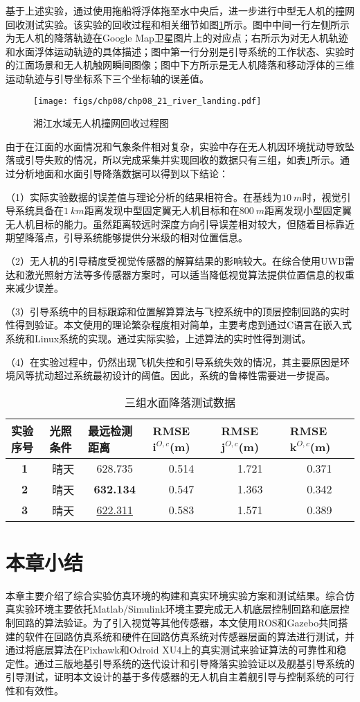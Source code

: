 基于上述实验，通过使用拖船将浮体拖至水中央后，进一步进行中型无人机的撞网回收测试实验。该实验的回收过程和相关细节如图\ref{fig:chp08_21_river_landing}所示。图中中间一行左侧所示为无人机的降落轨迹在Google Map卫星图片上的对应点；右所示为对无人机轨迹和水面浮体运动轨迹的具体描述；图中第一行分别是引导系统的工作状态、实验时的江面场景和无人机触网瞬间图像；图中下方所示是无人机降落和移动浮体的三维运动轨迹与引导坐标系下三个坐标轴的误差值。

\begin{figure}[!t]
	\centering
	\texttt{[image: figs/chp08/chp08\_21\_river\_landing.pdf]}	
	\caption{湘江水域无人机撞网回收过程图}
	\label{fig:chp08_21_river_landing}
\end{figure}

由于在江面的水面情况和气象条件相对复杂，实验中存在无人机因环境扰动导致坠落或引导失败的情况，所以完成采集并实现回收的数据只有三组，如表\ref{lab:three_ship_landing}所示。通过分析地面和水面引导降落数据可以得到以下结论：

（1）实际实验数据的误差值与理论分析的结果相符合。在基线为$10\ m$时，视觉引导系统具备在$1\ km$距离发现中型固定翼无人机目标和在$800\ m$距离发现小型固定翼无人机目标的能力。虽然距离较远时深度方向引导误差相对较大，但随着目标靠近期望降落点，引导系统能够提供分米级的相对位置信息。

（2）无人机的引导精度受视觉传感器的解算结果的影响较大。在综合使用UWB雷达和激光照射方法等多传感器方案时，可以适当降低视觉算法提供位置信息的权重来减少误差。

（3）引导系统中的目标跟踪和位置解算算法与飞控系统中的顶层控制回路的实时性得到验证。本文使用的理论繁杂程度相对简单，主要考虑到通过C语言在嵌入式系统和Linux系统的实现。通过实际实验，上述算法的实时性得到测试。

（4）在实验过程中，仍然出现飞机失控和引导系统失效的情况，其主要原因是环境风等扰动超过系统最初设计的阈值。因此，系统的鲁棒性需要进一步提高。

\begin{table}[!th]
	\centering
	\caption{三组水面降落测试数据}
	\label{lab:three_ship_landing}
	\begin{tabular}{cccccc}
		\hline
		\multicolumn{1}{l}{\textbf{实验序号}} & \multicolumn{1}{l}{\textbf{光照条件}} & \multicolumn{1}{l}{\textbf{最远检测距离}} & \multicolumn{1}{l}{\textbf{RMSE $\mathbf{i}^{O,c}$(m)}} & \multicolumn{1}{l}{\textbf{RMSE $\mathbf{j}^{O,c}$(m)}} & \multicolumn{1}{l}{\textbf{RMSE $\mathbf{k}^{O,c}$(m)}} \\ \hline
		\textbf{1} & 晴天 & 628.735 & 0.514 & 1.721 & 0.371 \\
		\textbf{2} & 晴天 & \textbf{632.134} & 0.547 & 1.363 & 0.342 \\
		\textbf{3} & 晴天 & \underline{622.311} & 0.583 & 1.571 & 0.389 \\ \hline
	\end{tabular}
\end{table}


\section{本章小结}
本章主要介绍了综合实验仿真环境的构建和真实环境实验方案和测试结果。综合仿真实验环境主要依托Matlab/Simulink环境主要完成无人机底层控制回路和底层控制回路的算法验证。为了引入视觉等其他传感器，本文使用ROS和Gazebo共同搭建的软件在回路仿真系统和硬件在回路仿真系统对传感器层面的算法进行测试，并通过将底层算法在Pixhawk和Odroid XU4上的真实测试来验证算法的可靠性和稳定性。通过三版地基引导系统的迭代设计和引导降落实验验证以及舰基引导系统的引导测试，证明本文设计的基于多传感器的无人机自主着舰引导与控制系统的可行性和有效性。